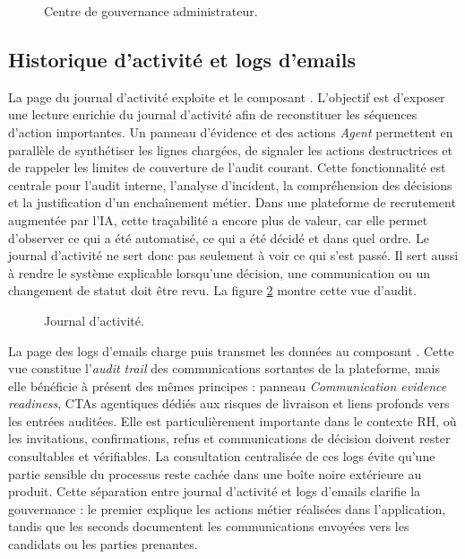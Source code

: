 \begin{figure}[H]
  \centering
  \caption{\label{fig:admin-governance}Centre de gouvernance administrateur.}
\end{figure}

\subsection{Historique d'activité et logs d'emails}
La page du journal d'activité exploite  et le composant . L'objectif est d'exposer une lecture enrichie du journal d'activité afin de reconstituer les séquences d'action importantes. Un panneau d'évidence et des actions \textit{Agent} permettent en parallèle de synthétiser les lignes chargées, de signaler les actions destructrices et de rappeler les limites de couverture de l'audit courant.
Cette fonctionnalité est centrale pour l'audit interne, l'analyse d'incident, la compréhension des décisions et la justification d'un enchaînement métier. Dans une plateforme de recrutement augmentée par l'IA, cette traçabilité a encore plus de valeur, car elle permet d'observer ce qui a été automatisé, ce qui a été décidé et dans quel ordre.
Le journal d'activité ne sert donc pas seulement à voir ce qui s'est passé. Il sert aussi à rendre le système explicable lorsqu'une décision, une communication ou un changement de statut doit être revu. La figure \ref{fig:admin-activity} montre cette vue d'audit.
\begin{figure}[H]
  \centering
  \caption{\label{fig:admin-activity}Journal d'activité.}
\end{figure}
La page des logs d'emails charge  puis transmet les données au composant . Cette vue constitue l'\textit{audit trail} des communications sortantes de la plateforme, mais elle bénéficie à présent des mêmes principes : panneau \textit{Communication evidence readiness}, CTAs agentiques dédiés aux risques de livraison et liens profonds vers les entrées auditées.
Elle est particulièrement importante dans le contexte RH, où les invitations, confirmations, refus et communications de décision doivent rester consultables et vérifiables. La consultation centralisée de ces logs évite qu'une partie sensible du processus reste cachée dans une boîte noire extérieure au produit.
Cette séparation entre journal d'activité et logs d'emails clarifie la gouvernance : le premier explique les actions métier réalisées dans l'application, tandis que les seconds documentent les communications envoyées vers les candidats ou les parties prenantes.

